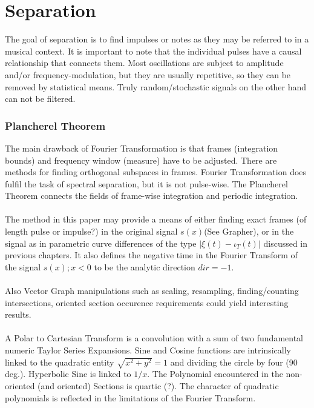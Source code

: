 \documentclass{report}
\begin{document}
\chapter{Separation}
The goal of separation is to find impulses or notes as they may be referred to in a musical context. It is important to note that the individual pulses have a causal relationship that connects them. Most oscillations are subject to amplitude and/or frequency-modulation, but they are usually repetitive, so they can be removed by statistical means. Truly random/stochastic signals on the other hand can not be filtered.

\subsection{Plancherel Theorem}
The main drawback of Fourier Transformation is that frames (integration bounds) and frequency window (measure) have to be adjusted. There are methods for finding orthogonal subspaces in frames. Fourier Transformation does fulfil the task of spectral separation, but it is not pulse-wise. The Plancherel Theorem connects the fields of frame-wise integration and periodic integration.\\\\
The method in this paper may provide a means of either finding exact frames (of length pulse or impulse?) in the original signal $s(x)$(See Grapher), or in the signal as in parametric curve differences of the type $\lvert \xi(t)-\iota_{T}(t) \rvert$ discussed in previous chapters. It also defines the negative time in the Fourier Transform of the signal $s(x);x<0$  to be the analytic direction $dir=-1$.\\\\
Also Vector Graph manipulations such as scaling, resampling, finding/counting intersections, oriented section occurence requirements could yield interesting results.\\\\
A Polar to Cartesian Transform is a convolution with a sum of two fundamental numeric Taylor Series Expansions. Sine and Cosine functions are intrinsically linked to the quadratic entity $\sqrt{x^2 + y^2} =1$ and dividing the circle by four (90 deg.). Hyperbolic Sine is linked to $1/x$. The Polynomial encountered in the non-oriented (and oriented) Sections is quartic (?). The character of quadratic polynomials is reflected in the limitations of the Fourier Transform.
\end{document}
